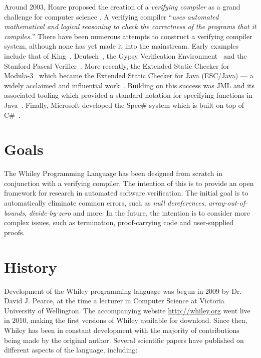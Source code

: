 Around 2003, Hoare proposed the creation of a {\em verifying compiler} as a grand challenge for computer science \cite{Hoare03}.  A verifying
compiler ``{\em uses automated mathematical and logical reasoning to
  check the correctness of the programs that it compiles.}''  There
have been numerous attempts to construct a verifying compiler system,
although none has yet made it into the mainstream.  Early examples
include that of King~\cite{King69}, Deutsch~\cite{Deutsch73}, the
Gypsy Verification Environment~\cite{Good85} and the Stanford Pascal
Verifier~\cite{LGHKMOPS95}.  More recently, the Extended Static
Checker for Modula-3~\cite{DLNS98} which became the Extended Static
Checker for Java (ESC/Java) --- a widely acclaimed and influential
work~\cite{FLLNSS02}.  Building on this success was JML and its
associated tooling which provided a standard notation for specifying
functions in Java~\cite{LCCRC05}.  Finally, Microsoft %
developed the Spec\# system which is built on top of
C\#~\cite{BLS04}.%

\section{Goals}

The Whiley Programming Language has been designed from scratch in
conjunction with a verifying compiler.  The intention of this is to
provide an open framework for research in automated software
verification.  The initial goal is to automatically eliminate common
errors, such as {\em null dereferences}, {\em array-out-of-bounds},
{\em divide-by-zero} and more.  In the future, the intention is to
consider more complex issues, such as termination, proof-carrying code and user-supplied proofs.

\section{History}

Development of the Whiley programming language was begun in 2009 by Dr. David J. Pearce, at the time a lecturer in Computer Science at Victoria University of Wellington.  The accompanying website \url{http://whiley.org} went live in 2010, making the first versions of Whiley available for download.  Since then, Whiley has been in constant development with the majority of contributions being made by the original author.  Several scientific papers have published on different aspects of the language, including:

